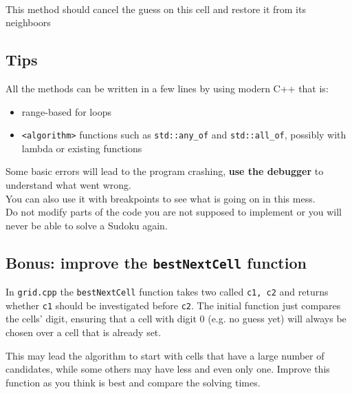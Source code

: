 \documentclass{ecnreport}
\begin{document}
 \begin{minipage}{.5cm}
~
 \end{minipage}
 \begin{minipage}{0.9\linewidth}
This method should cancel the guess on this cell and restore it from its neighboors
 \end{minipage}

 \subsection{Tips}

 All the methods can be written in a few lines by using modern C++ that is:
 \begin{itemize}
  \item range-based for loops
  \item \texttt{<algorithm>} functions such as \texttt{std::any\_of} and \texttt{std::all\_of}, possibly with lambda or existing functions
 \end{itemize}

 Some basic errors will lead to the program crashing, {\bf use the debugger} to understand what went wrong.
\\
You can also use it with breakpoints to see what is going on in this mess.\\

Do not modify parts of the code you are not supposed to implement or you will never be able to solve a Sudoku again.


\newpage


\subsection{Bonus: improve the \texttt{bestNextCell} function}

In \texttt{grid.cpp} the \texttt{bestNextCell} function takes two \Cell called \texttt{c1, c2} and returns whether \texttt{c1} should be investigated before \texttt{c2}. The initial function just compares the cells' digit, ensuring that a cell with digit 0 (e.g. no guess yet) will always be chosen over a cell that is already set.

This may lead the algorithm to start with cells that have a large number of candidates, while some others may have less and even only one. Improve this function as you think is best and compare the solving times.
\end{document}
